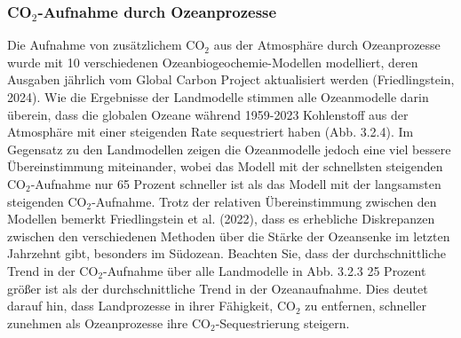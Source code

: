 \documentclass[12pt,paper=a4,DIV=12,parskip=never,chapterprefix=false,headings=standardclasses]{scrreprt}
\numberwithin{figure}{chapter}
\begin{document}
\subsubsection*{CO$_2$-Aufnahme durch Ozeanprozesse}
Die Aufnahme von zusätzlichem CO$_2$ aus der Atmosphäre durch Ozeanprozesse wurde mit 10 verschiedenen Ozeanbiogeochemie-Modellen modelliert, deren Ausgaben jährlich vom Global Carbon Project aktualisiert werden (Friedlingstein, 2024). Wie die Ergebnisse der Landmodelle stimmen alle Ozeanmodelle darin überein, dass die globalen Ozeane während 1959-2023 Kohlenstoff aus der Atmosphäre mit einer steigenden Rate sequestriert haben (Abb. 3.2.4). Im Gegensatz zu den Landmodellen zeigen die Ozeanmodelle jedoch eine viel bessere Übereinstimmung miteinander, wobei das Modell mit der schnellsten steigenden CO$_2$-Aufnahme nur 65 Prozent schneller ist als das Modell mit der langsamsten steigenden CO$_2$-Aufnahme. Trotz der relativen Übereinstimmung zwischen den Modellen bemerkt Friedlingstein et al. (2022), dass es erhebliche Diskrepanzen zwischen den verschiedenen Methoden über die Stärke der Ozeansenke im letzten Jahrzehnt gibt, besonders im Südozean.
Beachten Sie, dass der durchschnittliche Trend in der CO$_2$-Aufnahme über alle Landmodelle in Abb. 3.2.3 25 Prozent größer ist als der durchschnittliche Trend in der Ozeanaufnahme. Dies deutet darauf hin, dass Landprozesse in ihrer Fähigkeit, CO$_2$ zu entfernen, schneller zunehmen als Ozeanprozesse ihre CO$_2$-Sequestrierung steigern.
\end{document}
